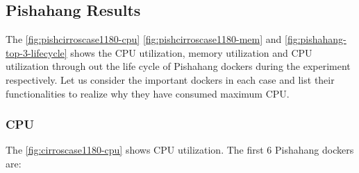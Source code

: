 \subsection{Pishahang Results}
The \ref{fig:pishcirroscase1180-cpu} \ref{fig:pishcirroscase1180-mem} and \ref{fig:pishahang-top-3-lifecycle} shows the CPU utilization, memory utilization and CPU utilization through out the life cycle of Pishahang dockers during the experiment respectively. Let us consider the important dockers in each case and list their functionalities to realize why they have consumed maximum CPU.


\subsubsection{CPU}

The \ref{fig:cirroscase1180-cpu} shows CPU utilization. The first 6 Pishahang dockers are:

